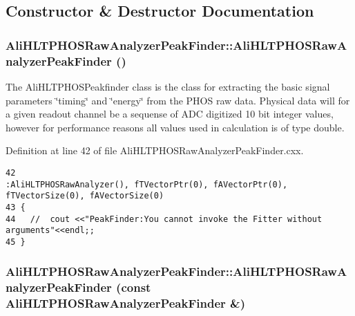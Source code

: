 \subsection{Constructor \& Destructor Documentation}
\subsubsection{\setlength{\rightskip}{0pt plus 5cm}Ali\-HLTPHOSRaw\-Analyzer\-Peak\-Finder::Ali\-HLTPHOSRaw\-Analyzer\-Peak\-Finder ()}\label{classAliHLTPHOSRawAnalyzerPeakFinder_a0}


The Ali\-HLTPHOSPeakfinder class is the class for extracting the basic signal parameters \char`\"{}timing\char`\"{} and \char`\"{}energy\char`\"{} from the PHOS raw data. Physical data will for a given readout channel be a sequense of ADC digitized 10 bit integer values, however for performance reasons all values used in calculation is of type double. 

Definition at line 42 of file Ali\-HLTPHOSRaw\-Analyzer\-Peak\-Finder.cxx.

\footnotesize\begin{verbatim}42                                                                 :AliHLTPHOSRawAnalyzer(), fTVectorPtr(0), fAVectorPtr(0), fTVectorSize(0), fAVectorSize(0)
43 {
44   //  cout <<"PeakFinder:You cannot invoke the Fitter without arguments"<<endl;;
45 }
\end{verbatim}\normalsize 


\subsubsection{\setlength{\rightskip}{0pt plus 5cm}Ali\-HLTPHOSRaw\-Analyzer\-Peak\-Finder::Ali\-HLTPHOSRaw\-Analyzer\-Peak\-Finder (const {\bf Ali\-HLTPHOSRaw\-Analyzer\-Peak\-Finder} \&)}\label{classAliHLTPHOSRawAnalyzerPeakFinder_a1}


